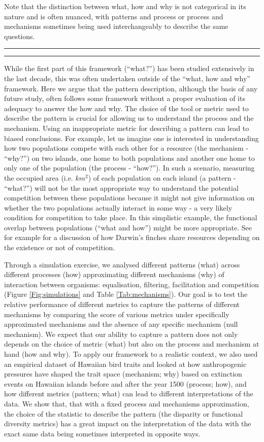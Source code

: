 \documentclass[12pt,letterpaper]{article}
\begin{document}
Note that the distinction between what, how and why is not categorical in its nature and is often nuanced, with patterns and process or process and mechanisms sometimes being used interchangeably to describe the same questions.

\bigskip
\hrule
\hrule
\bigskip

While the first part of this framework (``what?'') has been studied extensively in the last decade, this was often undertaken outside of the ``what, how and why'' framework.
Here we argue that the pattern description, although the basis of any future study, often follows some framework without a proper evaluation of its adequacy to answer the how and why.
The choice of the tool or metric used to describe the pattern is crucial for allowing us to understand the process and the mechanism.
Using an inappropriate metric for describing a pattern can lead to biased conclusions.
For example, let us imagine one is interested in understanding how two populations compete with each other for a resource (the mechanism - ``why?'') on two islands, one home to both populations and another one home to only one of the population (the process - ``how?'').
In such a scenario, measuring the occupied area (i.e. $km^{2}$) of each population on each island (a pattern - ``what?'') will not be the most appropriate way to understand the potential competition between these populations because it might not give information on whether the two populations actually interact in some way - a very likely condition for competition to take place.
In this simplistic example, the functional overlap between populations (``what and how'') might be more appropriate.
See for example \citealt{carvalho2020decomposing} for a discussion of how Darwin's finches share resources depending on the existence or not of competition.

Through a simulation exercise, we analysed different patterns (what) across different processes (how) approximating different mechanisms (why) of interaction between organisms: equalisation, filtering, facilitation and competition (Figure \ref{Fig:simulations} and Table \ref{Tab:mechanisms}).
Our goal is to test the relative performance of different metrics to capture the patterns of different mechanisms by comparing the score of various metrics under specifically approximated mechanisms and the absence of any specific mechanism (null mechanism).
We expect that our ability to capture a pattern does not only depends on the choice of metric (what) but also on the process and mechanism at hand (how and why).
To apply our framework to a realistic context, we also used an empirical dataset of Hawaiian bird traits and looked at how anthropogenic pressures have shaped the trait space (mechanism; why) based on extinction events on Hawaiian islands before and after the year 1500 (process; how), and how different metrics (pattern; what) can lead to different interpretations of the data.
We show that, that with a fixed process and mechanisms approximation, the choice of the statistic to describe the pattern (the disparity or functional diversity metrics) has a great impact on the interpretation of the data with the exact same data being sometimes interpreted in opposite ways.
\end{document}

